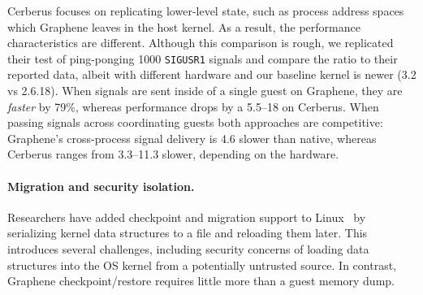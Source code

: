 Cerberus focuses on replicating lower-level state, such as process address spaces
which Graphene leaves in the host kernel.
As a result, the performance characteristics are different.
Although this comparison is rough, 
we replicated their test of ping-ponging 1000 
{\tt SIGUSR1} signals and compare the ratio to their reported data, 
albeit with different hardware and our baseline kernel is newer 
(3.2 vs 2.6.18).  
When signals are sent inside of a single guest on Graphene, they are {\em faster}
by 79\%, whereas performance drops by a 5.5--18\x{} on Cerberus.
When passing signals across coordinating guests both approaches are competitive:
Graphene's cross-process signal delivery is 4.6\x{} slower than native, whereas Cerberus ranges from 
3.3--11.3\x{} slower, depending on the hardware.



\paragraph{Migration and security isolation.}
Researchers have added checkpoint and migration support to Linux~\citep{linux-cr}
by serializing kernel data structures to a file
and reloading them later.  
This introduces several challenges, including
security concerns of loading data structures into the OS kernel from a potentially 
untrusted source.
In contrast, Graphene checkpoint/restore 
requires little more than a guest memory dump.



